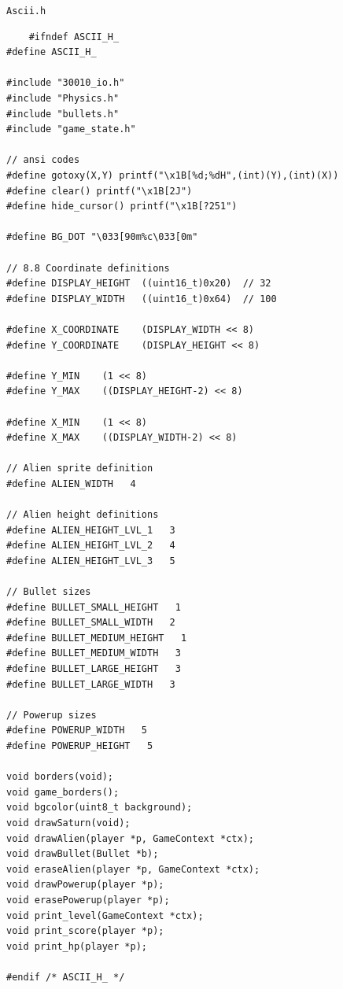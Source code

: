 \texttt{Ascii.h}
\begin{lstlisting}
    #ifndef ASCII_H_
#define ASCII_H_

#include "30010_io.h"
#include "Physics.h"
#include "bullets.h"
#include "game_state.h"

// ansi codes
#define gotoxy(X,Y) printf("\x1B[%d;%dH",(int)(Y),(int)(X))
#define clear() printf("\x1B[2J")
#define hide_cursor() printf("\x1B[?251")

#define BG_DOT "\033[90m%c\033[0m"

// 8.8 Coordinate definitions
#define DISPLAY_HEIGHT  ((uint16_t)0x20)  // 32
#define DISPLAY_WIDTH   ((uint16_t)0x64)  // 100

#define X_COORDINATE    (DISPLAY_WIDTH << 8)
#define Y_COORDINATE    (DISPLAY_HEIGHT << 8)

#define Y_MIN    (1 << 8)
#define Y_MAX    ((DISPLAY_HEIGHT-2) << 8)

#define X_MIN    (1 << 8)
#define X_MAX    ((DISPLAY_WIDTH-2) << 8)

// Alien sprite definition
#define ALIEN_WIDTH   4

// Alien height definitions
#define ALIEN_HEIGHT_LVL_1   3
#define ALIEN_HEIGHT_LVL_2   4
#define ALIEN_HEIGHT_LVL_3   5

// Bullet sizes
#define BULLET_SMALL_HEIGHT   1
#define BULLET_SMALL_WIDTH   2
#define BULLET_MEDIUM_HEIGHT   1
#define BULLET_MEDIUM_WIDTH   3
#define BULLET_LARGE_HEIGHT   3
#define BULLET_LARGE_WIDTH   3

// Powerup sizes
#define POWERUP_WIDTH   5
#define POWERUP_HEIGHT   5

void borders(void);
void game_borders();
void bgcolor(uint8_t background);
void drawSaturn(void);
void drawAlien(player *p, GameContext *ctx);
void drawBullet(Bullet *b);
void eraseAlien(player *p, GameContext *ctx);
void drawPowerup(player *p);
void erasePowerup(player *p);
void print_level(GameContext *ctx);
void print_score(player *p);
void print_hp(player *p);

#endif /* ASCII_H_ */
\end{lstlisting}

